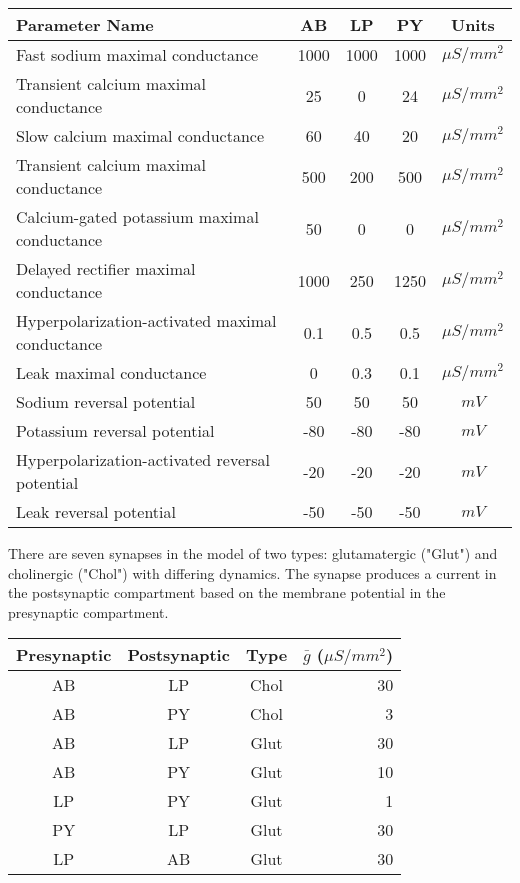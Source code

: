 \documentclass[utf8]{frontiers_suppmat} %
\begin{document}
		\begin{center}
			\begin{tabular}{|l|c|c|c|c|}
				\hline 
				\textbf{Parameter Name} & \textbf{AB} & \textbf{LP} & \textbf{PY} & \textbf{Units} \\ 
				\hline 
				Fast sodium maximal conductance & 1000 & 1000 & 1000 & $\mu S/mm^2$ \\ 
				\hline 
				Transient calcium maximal conductance & 25 & 0 & 24 & $\mu S/mm^2$ \\  
				\hline 
				Slow calcium maximal conductance & 60 & 40 & 20 & $\mu S/mm^2$ \\  
				\hline 
				Transient calcium maximal conductance & 500 & 200 & 500 & $\mu S/mm^2$ \\  
				\hline 
				Calcium-gated potassium maximal conductance & 50 & 0 & 0 & $\mu S/mm^2$ \\  
				\hline 
				Delayed rectifier maximal conductance & 1000 & 250 & 1250 & $\mu S/mm^2$ \\  
				\hline 
				Hyperpolarization-activated maximal conductance & 0.1 & 0.5 & 0.5 & $\mu S/mm^2$ \\  
				\hline 
				Leak maximal conductance & 0 & 0.3 & 0.1 & $\mu S/mm^2$ \\  
				\hline 
				Sodium reversal potential & 50 & 50 & 50 & $mV$ \\ 
				\hline 
				Potassium reversal potential & -80 & -80 & -80 & $mV$ \\ 
				\hline
				Hyperpolarization-activated reversal potential & -20 & -20 & -20 & $mV$ \\
				\hline
				Leak reversal potential & -50 & -50 & -50 & $mV$ \\
				\hline
			\end{tabular}
		\end{center}
	
		There are seven synapses in the model of two types: glutamatergic ("Glut") and cholinergic ("Chol") with differing dynamics. The synapse produces a current in the postsynaptic compartment based on the membrane potential in the presynaptic compartment. 
		
		\begin{center}
			\begin{tabular}{|c|c|c|r|}
				\hline
				\textbf{Presynaptic} & \textbf{Postsynaptic} & \textbf{Type} & $\bar{g}$ ($\mu S/mm^2$) \\
				\hline
				AB & LP & Chol & 30 \\ \hline
				AB & PY & Chol & 3 \\ \hline
				AB & LP & Glut & 30 \\ \hline
				AB & PY & Glut & 10 \\ \hline
				LP & PY & Glut & 1 \\ \hline
				PY & LP & Glut & 30 \\ \hline
				LP & AB & Glut & 30 \\ \hline
			\end{tabular}
		\end{center}

\cleardoublepage

\printbibliography
\end{document}
